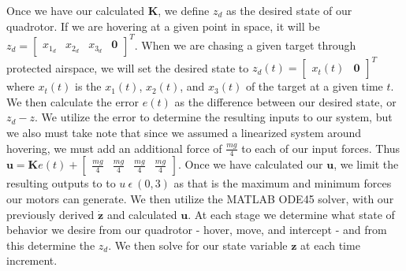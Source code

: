 \documentclass{article}
\begin{document}
\begin{multicols}{2}
Once we have our calculated $\boldsymbol{K}$, we define $z_d$ as the desired state of our quadrotor. If we are hovering  
at a given point in space, it will be $z_d=\begin{bmatrix} x_{1_d} & x_{2_d} & x_{3_d} & \boldsymbol{0} 
\end{bmatrix}^T$. When we are chasing a given target through protected airspace, we will set the desired state to 
$z_d(t)=\begin{bmatrix} x_t(t) & \boldsymbol{0} \end{bmatrix}^T$ where $x_t(t)$ is the $x_1(t)$, $x_2(t)$, and $x_3(t)$ of the target at a given 
time $t$. We then calculate the error $e(t)$ as the difference between our desired state, or $z_d - z$. We utilize the error to 
determine the resulting inputs to our system, but we also must take note that since we assumed a linearized system around 
hovering, we must add an additional force of $\frac{mg}{4}$ to each of our input forces. Thus $\boldsymbol{u}= \boldsymbol{K}e(t) + 
\begin{bmatrix}\frac{mg}{4} & \frac{mg}{4} & \frac{mg}{4} & \frac{mg}{4}\end{bmatrix}$. 
Once we have calculated our $\boldsymbol{u}$, we limit the resulting outputs to to $u\  \epsilon\  (0, 3)$ as that is the maximum and 
minimum forces our motors can generate.
We then utilize the MATLAB ODE45 solver, with our previously derived $\boldsymbol{\dot{z}}$ and calculated $
\boldsymbol{u}$. At each stage we determine what state of behavior we desire from our quadrotor - hover, move, and intercept - 
and from this determine the $z_d$. We then solve for our state variable $\boldsymbol{z}$ at each time increment.

\end{multicols}
\end{document}
